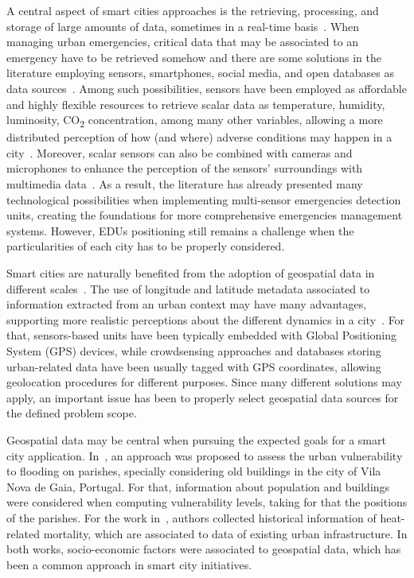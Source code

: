 \begin{refsection}
A central aspect of smart cities approaches is the retrieving, processing, and storage of large amounts of data, sometimes in a real-time basis~\cite{surveycity1}. When managing urban emergencies, critical data that may be associated to an emergency have to be retrieved somehow and there are some solutions in the literature employing sensors, smartphones, social media, and open databases as data sources~\cite{surveycity2,emergencies1}. Among such possibilities, sensors have been employed as affordable and highly flexible resources to retrieve scalar data as temperature, humidity, luminosity, CO\textsubscript{2} concentration, among many other variables, allowing a more distributed perception of how (and where) adverse conditions may happen in a city~\cite{multiSensor,surveyEmergencies2}. Moreover, scalar sensors can also be combined with cameras and microphones to enhance the perception of the sensors' surroundings with multimedia data~\cite{smartcitiescameras}. As a result, the literature has already presented many technological possibilities when implementing multi-sensor emergencies detection units, creating the foundations for more comprehensive emergencies management systems. However, EDUs positioning still remains a challenge when the particularities of each city has to be properly considered.

Smart cities are naturally benefited from the adoption of geospatial data in different scales~\cite{sharingservices}. The use of longitude and latitude metadata associated to information extracted from an urban context may have many advantages, supporting more realistic perceptions about the different dynamics in a city~\cite{surveygps}. For that, sensors-based units have been typically embedded with Global Positioning System (GPS) devices, while crowdsensing approaches and databases storing urban-related data have been usually tagged with GPS coordinates, allowing geolocation procedures for different purposes. Since many different solutions may apply, an important issue has been to properly select geospatial data sources for the defined problem scope.

Geospatial data may be central when pursuing the expected goals for a smart city application. In~\cite{Fernandez_2015}, an approach was proposed to assess the urban vulnerability to flooding on parishes, specially considering old buildings in the city of Vila Nova de Gaia, Portugal. For that, information about population and buildings were considered when computing vulnerability levels, taking for that the positions of the parishes. For the work in~\cite{Hondula_2015}, authors collected historical information of heat-related mortality, which are associated to data of existing urban infrastructure. In both works, socio-economic factors were associated to geospatial data, which has been a common approach in smart city initiatives.


\end{refsection}
